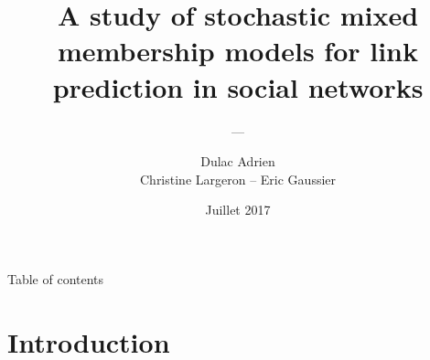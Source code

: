 \title{A study of stochastic mixed membership models for link prediction in social networks}
\subtitle{---\\}
\author[Dulac Adrien]{Dulac Adrien\\[3mm] Christine Largeron -- Eric Gaussier}
\date{Juillet 2017}

\usepackage[backend=bibtex]{biblatex}




\begin{frame}
    \titlepage
     
\end{frame}



\begin{frame}{Table of contents}
    \tableofcontents
\end{frame}


\section{Introduction}

%
%

